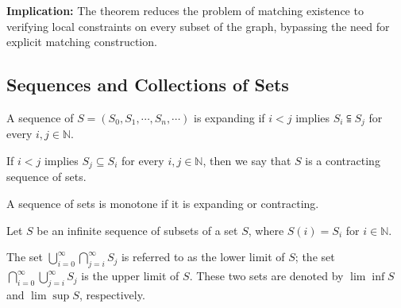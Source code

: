 \documentclass[../main.tex]{subfiles}
\begin{document}
\begin{green}
    
\textbf{Implication:} The theorem reduces the problem of matching existence to verifying local constraints on every subset of the graph, bypassing the need for explicit matching construction.

\end{green}



\subsection{Sequences and Collections of Sets}

\begin{purple}
\begin{definition}

A sequence of $S=(S_0,S_1,\cdots,S_n,\cdots)$ is expanding if $i<j$ implies $S_i\subseteqq S_j$ for every $i,j\in \mathbb{N}$.


If $i<j$ implies $S_j \subseteq S_i$ for every $i,j\in \mathbb{N}$, then we say that $S$ is a contracting sequence of sets.

A sequence of sets is monotone if it is expanding or contracting.
\end{definition}
\end{purple}

\begin{purple}
\begin{definition}
Let $S$ be an infinite sequence of subsets of a set $S$, where $S(i)=S_i$ for $i\in \mathbb{N}$.

The set $\bigcup_{i=0}^\infty\bigcap_{j=i}^{\infty}S_j$ is referred to as the lower limit of $S$; the set $\bigcap_{i=0}^{\infty}\bigcup_{j=i}^{\infty} S_j$ is the upper limit of $S$. These two sets are denoted by $\lim\inf S$ and $\lim\sup S$, respectively.
\end{definition}
\end{purple}
\end{document}

